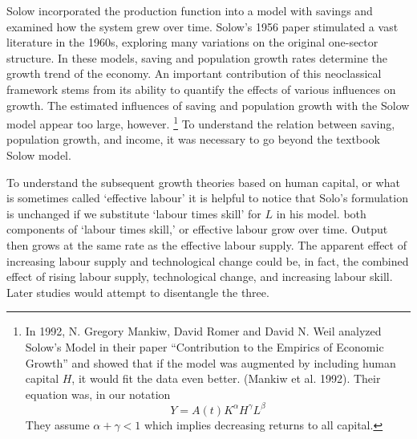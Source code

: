 Solow incorporated the production function into a model with savings and examined how the system grew over time. Solow's 1956 paper stimulated a vast literature in the 1960s, exploring many variations on the original one-sector structure. %
In these models, saving and population growth rates determine the growth trend of the economy. An important  contribution of this neoclassical framework stems from its ability to quantify the effects of various influences on growth. The estimated influences of saving and population growth with the Solow model appear too large, however.%
\footnote{In 1992, N. Gregory Mankiw, David Romer %
and David N. Weil analyzed Solow's Model in their paper ``Contribution to the Empirics of Economic Growth'' and  showed that %
if the model was augmented by including human capital $H$, it would fit the data even better.   (Mankiw et al. 1992). Their equation was, in our notation   
\begin{equation*}
Y=A(t)K^\alpha H^\gamma L^\beta 
\end{equation*}
They assume $\alpha+\gamma<1$ which implies decreasing returns to all capital.} 
To understand the relation between saving, population growth, and income, it was necessary to go beyond the textbook Solow model.%

To understand the subsequent growth theories based on human capital, or what is sometimes called `effective labour' it is helpful to notice that Solo's formulation is unchanged if we substitute `labour times  skill' for $L$ in his model. both components of `labour times  skill,' or effective labour grow over time. Output then grows at the same rate as the effective labour supply. The apparent effect of increasing labour supply and technological change could be, in fact, the combined effect of rising labour supply, technological change, and increasing labour skill. Later studies would attempt to disentangle the three.


